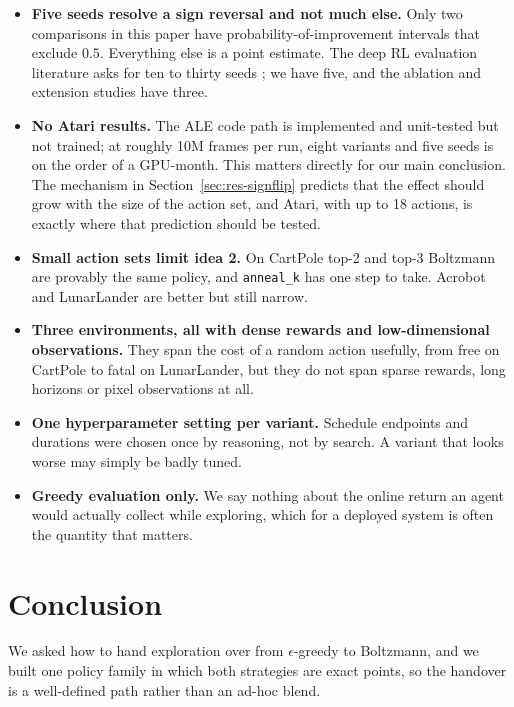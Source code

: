 \documentclass[11pt,a4paper]{article}
\begin{document}
\begin{itemize}
\item \textbf{Five seeds resolve a sign reversal and not much else.} Only two
      comparisons in this paper have probability-of-improvement intervals that
      exclude $0.5$. Everything else is a point estimate. The deep RL
      evaluation literature asks for ten to thirty seeds
      \cite{agarwal2021,henderson2018}; we have five, and the ablation and
      extension studies have three.
\item \textbf{No Atari results.} The ALE code path is implemented and
      unit-tested but not trained; at roughly 10M frames per run, eight
      variants and five seeds is on the order of a GPU-month. This matters
      directly for our main conclusion. The mechanism in
      Section~\ref{sec:res-signflip} predicts that the effect should grow with
      the size of the action set, and Atari, with up to 18 actions, is exactly
      where that prediction should be tested.
\item \textbf{Small action sets limit idea 2.} On CartPole top-2 and top-3
      Boltzmann are provably the same policy, and \texttt{anneal\_k} has one
      step to take. Acrobot and LunarLander are better but still narrow.
\item \textbf{Three environments, all with dense rewards and low-dimensional
      observations.} They span the cost of a random action usefully, from free
      on CartPole to fatal on LunarLander, but they do not span sparse rewards,
      long horizons or pixel observations at all.
\item \textbf{One hyperparameter setting per variant.} Schedule endpoints and
      durations were chosen once by reasoning, not by search. A variant that
      looks worse may simply be badly tuned.
\item \textbf{Greedy evaluation only.} We say nothing about the online return
      an agent would actually collect while exploring, which for a deployed
      system is often the quantity that matters.
\end{itemize}

\section{Conclusion}
\label{sec:conclusion}

We asked how to hand exploration over from $\epsilon$-greedy to Boltzmann, and
we built one policy family in which both strategies are exact points, so the
handover is a well-defined path rather than an ad-hoc blend.
\end{document}
